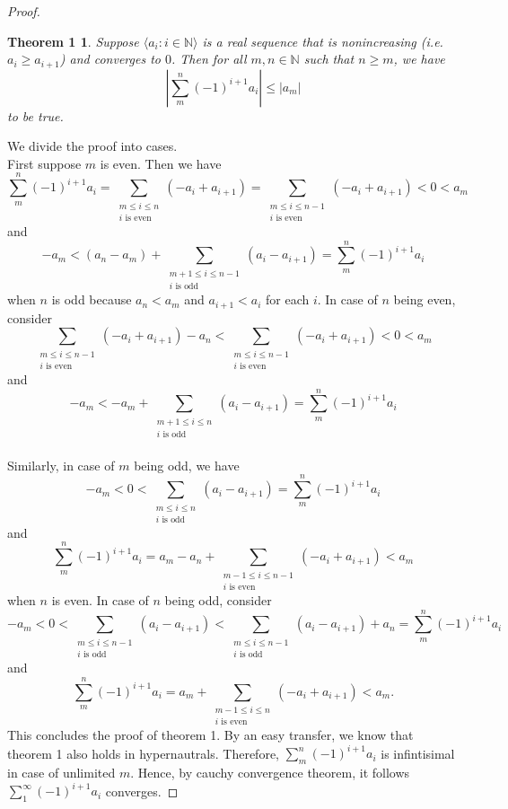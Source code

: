 \documentclass[a4paper, 11pt, openany]{book}
\theoremstyle{plain}
\newtheorem*{theorem1}{Theorem 1}
\theoremstyle{plain}
\newcommand{\N}{\mathbb{N}}
\newcommand{\la}{\langle}
\newcommand{\ra}{\rangle}
\begin{document}
\begin{proof}
    \begin{theorem1}
      Suppose $\la a_i: i \in \N \ra$ is a real sequence that is nonincreasing (i.e. $a_i \geq a_{i+1}$) and converges to $0$. Then for all $m,n \in \N$ such that $n\geq m$, we have $$\left| \sum_{m}^n (-1)^{i+1} a_i \right| \leq |a_m|$$ to be true.
    \end{theorem1}
    We divide the proof into  cases. \\
    First suppose $m$ is even. Then we have $$ \sum_{m}^n (-1)^{i+1} a_i=\sum_{\substack{m \leq i \leq n \\ i \text{ is even }}} (-a_i+a_{i+1})=\sum_{\substack{m \leq i \leq n-1  \\ i \text{ is even }}} (-a_i+a_{i+1})<0 <a_m$$ and $$-a_m<(a_n - a_m)+ \sum_{\substack{m+1 \leq i \leq n-1  \\ i \text{ is odd }}} (a_i-a_{i+1})=\sum_{m}^n (-1)^{i+1} a_i$$ when $n$ is odd because $a_n<a_m$ and $a_{i+1}<a_i$ for each $i$. In case of $n$ being even, consider $$\sum_{\substack{m \leq i \leq n-1  \\ i \text{ is even }}} (-a_i+a_{i+1})-a_n<\sum_{\substack{m \leq i \leq n-1  \\ i \text{ is even }}} (-a_i+a_{i+1})<0<a_m$$ and $$-a_m<- a_m+ \sum_{\substack{m+1 \leq i \leq n  \\ i \text{ is odd }}} (a_i-a_{i+1})=\sum_{m}^n (-1)^{i+1} a_i$$ \\
    Similarly, in case of $m$ being odd, we have $$-a_m<0< \sum_{\substack{m \leq i \leq n \\ i \text{ is odd}}} (a_i-a_{i+1}) =\sum_{m}^n (-1)^{i+1} a_i$$ and $$\sum_{m}^n (-1)^{i+1} a_i=a_m-a_n+\sum_{\substack{m-1 \leq i \leq n-1 \\ i \text{ is even }}} (-a_i+a_{i+1})<a_m$$ when $n$ is even. In case of $n$ being odd, consider $$-a_m<0<\sum_{\substack{m \leq i \leq n-1 \\ i \text{ is odd}}} (a_i-a_{i+1})<\sum_{\substack{m \leq i \leq n-1 \\ i \text{ is odd}}} (a_i-a_{i+1})+a_n=\sum_{m}^n (-1)^{i+1} a_i$$ and $$\sum_{m}^n (-1)^{i+1} a_i=a_m+\sum_{\substack{m-1 \leq i \leq n \\ i \text{ is even }}} (-a_i+a_{i+1})<a_m. $$ This concludes the proof of theorem 1. By an easy transfer, we know that theorem 1 also holds in hypernautrals. Therefore, $\sum_{m}^n (-1)^{i+1} a_i$ is infintisimal in case of unlimited $m$. Hence, by cauchy convergence theorem, it follows $\sum_{1}^\infty (-1)^{i+1} a_i$ converges.
  \end{proof}
\end{document}
